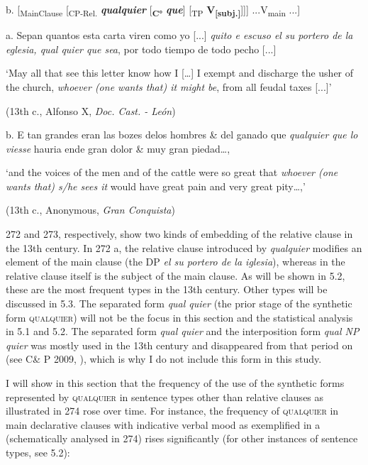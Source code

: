 \documentclass[output=paper]{langscibook}
\begin{document}
  b.  [\textsubscript{MainClause} [\textsubscript{CP-Rel.} \textbf{\textit{qualquier} }[\textbf{\textsubscript{C°}} \textbf{\textit{que}}] [\textsubscript{TP} \textbf{V\textsubscript{[subj.]}}]]] ...V\textsubscript{main} ...]

  a.  Sepan quantos esta carta viren como yo [...] \textit{quito e escuso el su portero de la eglesia, qual quier que sea}, por todo tiempo de todo pecho [...] 

    ‘May all that see this letter know how I […] I exempt and discharge the usher of the church, \textit{whoever (one wants that) it might be}, from all feudal taxes [...]’

    (13th c., Alfonso X, \textit{Doc. Cast. - León})

  b.  E tan grandes eran las bozes delos hombres \& del ganado que \textit{qualquier que lo viesse} hauria ende gran dolor \& muy gran piedad…, 

    ‘and the voices of the men and of the cattle were so great that \textit{whoever (one wants that) s/he sees it} would have great pain and very great pity…,’

    (13th c., Anonymous, \textit{Gran Conquista})

272 and 273, respectively, show two kinds of embedding of the relative clause in the 13th century. In 272 a, the relative clause introduced by \textit{qualquier} modifies an element of the main clause (the DP \textit{el su portero de la iglesia}), whereas in  the relative clause itself is the subject of the main clause. As will be shown in 5.2, these are the most frequent types in the 13th century. Other types will be discussed in 5.3. The separated form \textit{qual quier} (the prior stage of the synthetic form \textsc{qualquier}) will not be the focus in this section and the statistical analysis in 5.1 and 5.2. The separated form \textit{qual quier} and the interposition form \textit{qual NP quier} was mostly used in the 13th century and disappeared from that period on (see C\& P 2009, \citealt{Pato2012}), which is why I do not include this form in this study. 

  I will show in this section that the frequency of the use of the synthetic forms represented by \textsc{qualquier} in sentence types other than relative clauses as illustrated in 274 rose over time. For instance, the frequency of \textsc{qualquier} in main declarative clauses with indicative verbal mood as exemplified in a (schematically analysed in 274) rises significantly (for other instances of sentence types, see 5.2):
\end{document}
